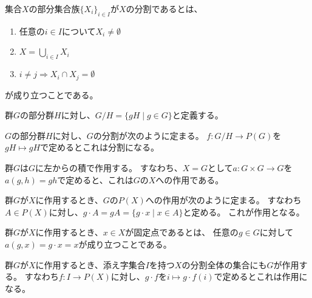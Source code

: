 \begin{definition}
    \label{decomposition-def}
    \leanok    
    集合$X$の部分集合族$\{X_i\}_{i\in I}$が$X$の分割であるとは、
    \begin{enumerate}
        \item 任意の$i\in I$について$X_i\neq\emptyset$
        \item $X=\bigcup_{i\in I}X_i$
        \item $i\neq j\Rightarrow X_i\cap X_j=\emptyset$
    \end{enumerate}
    が成り立つことである。
\end{definition}

\begin{definition}
    \label{quotient-def}
    群$G$の部分群$H$に対し、$G/H=\{gH\mid g\in G\}$と定義する。
\end{definition}

\begin{proposition}
    \label{subgroup-decomp}
    $G$の部分群$H$に対し、$G$の分割が次のように定まる。
    $f:G/H\to P(G)$を$gH\mapsto gH$で定めるとこれは分割になる。
\end{proposition}

\begin{proposition}
    \label{left-multiplication}
    群$G$は$G$に左からの積で作用する。
    すなわち、$X=G$として$a:G\times G\to G$を$a(g,h)=gh$で定めると、これは$G$の$X$への作用である。
\end{proposition}

\begin{proposition}
    \label{powerset-action}
    群$G$が$X$に作用するとき、$G$の$P(X)$への作用が次のように定まる。
    すなわち$A\in P(X)$に対し、$g\cdot A=gA=\{g\cdot x\mid x\in A\}$と定める。
    これが作用となる。
\end{proposition}

\begin{proposition}
    \label{fixed-point}
    群$G$が$X$に作用するとき、$x\in X$が固定点であるとは、
    任意の$g\in G$に対して$a(g,x)=g\cdot x=x$が成り立つことである。
\end{proposition}

\begin{proposition}
    \label{decomp-action}
    群$G$が$X$に作用するとき、添え字集合$I$を持つ$X$の分割全体の集合にも$G$が作用する。
    すなわち$f:I\to P(X)$に対し、$g\cdot f$を$i\mapsto g\cdot f(i)$で定めるとこれは作用になる。
\end{proposition}

